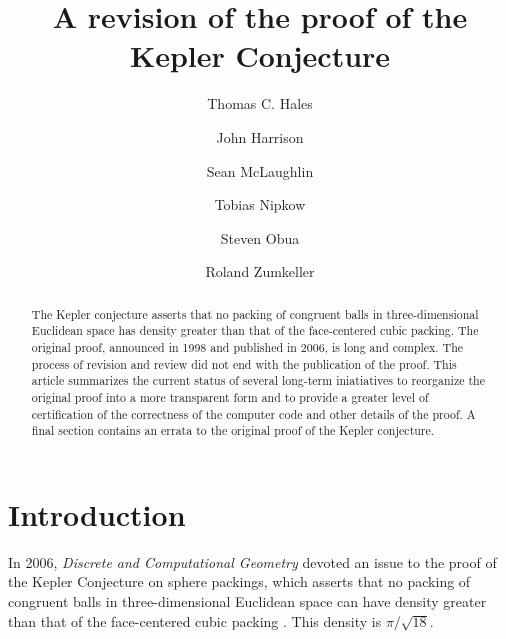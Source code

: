 \documentclass[11pt]{amsart}
\begin{document}
\title{A revision of the proof of the Kepler Conjecture}

\author[Hales]{Thomas C. Hales}
\address[T.~Hales]{Math Department, University of Pittsburgh}

\author[Harrison]{John Harrison}
\address[J.~Harrison]{Intel Corporation,  JF1-13, 2111 NE 25th Avenue
 Hillsboro, OR 97124
 USA}

\author[McLaughlin]{Sean McLaughlin}
\address[S.~McLaughlin]{Carnegie Mellon University}

\author[Nipkow]{Tobias Nipkow}
\address[T.~Nipkow]{Department for Informatics, Technische Universit\"at
M\"unchen}

\author[Obua]{Steven Obua}
\address[S.~Obua]{Department for Informatics, Technische Universit\"at
M\"unchen}

\author[Zumkeller]{Roland Zumkeller}
\address[R.~Zumkeller]{\'Ecole Polytechnique, Paris}

\begin{abstract}
The Kepler conjecture asserts that no packing of congruent balls in three-dimensional Euclidean space 
has density greater than that of the face-centered cubic packing.  The original proof,
announced in 1998 and published in 2006, is long and complex. The process of  revision and review did not end with the publication of the proof.
This article summarizes the current status of several long-term iniatiatives to
reorganize the original proof into a more transparent form and to provide a greater
level of certification of the correctness of the computer code and other details of the proof.
A final section contains an errata to the original proof of the Kepler conjecture.
\end{abstract}


\maketitle

\section{Introduction}

In 2006, {\it Discrete and Computational Geometry} devoted an issue to the
proof of the Kepler Conjecture on sphere packings, which asserts that no
packing of congruent balls in three-dimensional Euclidean space can
have density greater than that of the face-centered cubic packing \cite{Hales:2006:DCG}.
This density is $\pi/\sqrt{18}$.
\end{document}
